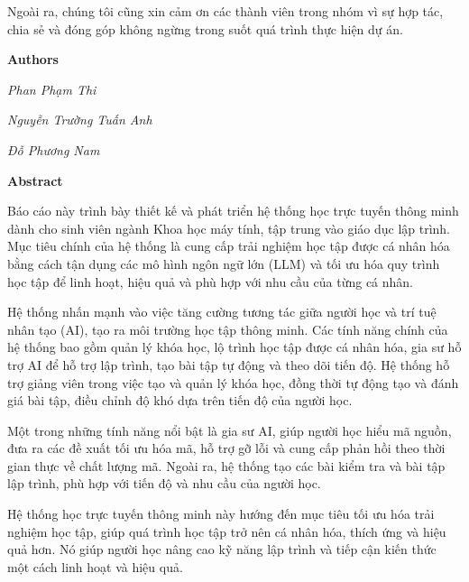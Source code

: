 \documentclass[12pt,a4paper]{report}
\theoremstyle{definition}
\begin{document}
Ngoài ra, chúng tôi cũng xin cảm ơn các thành viên trong nhóm vì sự hợp tác, chia sẻ và đóng góp không ngừng trong suốt quá trình thực hiện dự án.
\par\hfill\textbf{Authors}\hspace{1cm}

\par\hfill\textit{Phan Phạm Thi}\hspace{0.3cm}
\par\hfill\textit{Nguyễn Trường Tuấn Anh}\hspace{0.2cm}\par\hfill\textit{Đỗ Phương Nam}
\newpage

\begin{center}
    \textbf{\Large Abstract} \par
\end{center}
Báo cáo này trình bày thiết kế và phát triển hệ thống học trực tuyến thông minh dành cho sinh viên ngành Khoa học máy tính, tập trung vào giáo dục lập trình. Mục tiêu chính của hệ thống là cung cấp trải nghiệm học tập được cá nhân hóa bằng cách tận dụng các mô hình ngôn ngữ lớn (LLM) và tối ưu hóa quy trình học tập để linh hoạt, hiệu quả và phù hợp với nhu cầu của từng cá nhân.

Hệ thống nhấn mạnh vào việc tăng cường tương tác giữa người học và trí tuệ nhân tạo (AI), tạo ra môi trường học tập thông minh. Các tính năng chính của hệ thống bao gồm quản lý khóa học, lộ trình học tập được cá nhân hóa, gia sư hỗ trợ AI để hỗ trợ lập trình, tạo bài tập tự động và theo dõi tiến độ. Hệ thống hỗ trợ giảng viên trong việc tạo và quản lý khóa học, đồng thời tự động tạo và đánh giá bài tập, điều chỉnh độ khó dựa trên tiến độ của người học.

Một trong những tính năng nổi bật là gia sư AI, giúp người học hiểu mã nguồn, đưa ra các đề xuất tối ưu hóa mã, hỗ trợ gỡ lỗi và cung cấp phản hồi theo thời gian thực về chất lượng mã. Ngoài ra, hệ thống tạo các bài kiểm tra và bài tập lập trình, phù hợp với tiến độ và nhu cầu của người học.

Hệ thống học trực tuyến thông minh này hướng đến mục tiêu tối ưu hóa trải nghiệm học tập, giúp quá trình học tập trở nên cá nhân hóa, thích ứng và hiệu quả hơn. Nó giúp người học nâng cao kỹ năng lập trình và tiếp cận kiến thức một cách linh hoạt và hiệu quả.
\newpage

\begin{singlespace}
\tableofcontents
\end{singlespace}
\newpage
\end{document}

